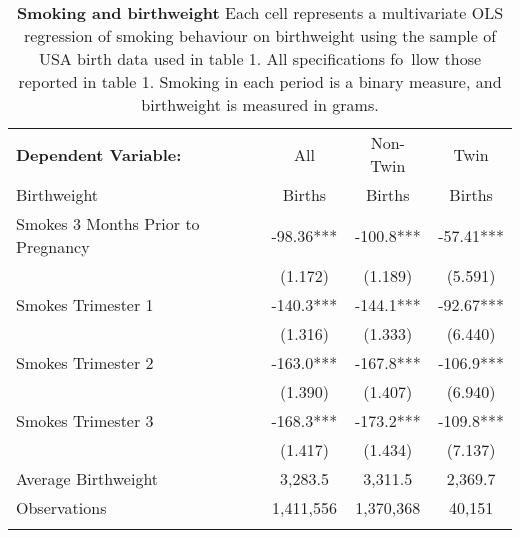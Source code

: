 \documentclass{nature}
\begin{document}
\begin{linenumbers}
\begin{spacing}{1}
\begin{table}
  \begin{center}
    \begin{tabular}{lccc}
      \toprule
      \textbf{Dependent Variable:}      & All & Non-Twin & Twin \\
      Birthweight      & Births & Births & Births \\
      \midrule
      Smokes 3 Months Prior to Pregnancy & -98.36*** & -100.8*** & -57.41*** \\
      & (1.172) & (1.189) &  (5.591) \\
      Smokes Trimester 1 & -140.3*** & -144.1*** & -92.67*** \\
      & (1.316) & (1.333) & (6.440) \\
      Smokes Trimester 2 & -163.0*** & -167.8*** & -106.9*** \\
      & (1.390) & (1.407) & (6.940) \\
      Smokes Trimester 3 & -168.3*** & -173.2*** & -109.8*** \\
      & (1.417) & (1.434) & (7.137) \\
      \midrule
      Average Birthweight & 3,283.5   & 3,311.5   & 2,369.7 \\
      Observations        & 1,411,556 & 1,370,368 & 40,151  \\
      \bottomrule
      \caption{\textbf{Smoking and birthweight} {\footnotesize Each cell represents a multivariate OLS regression of smoking behaviour on birthweight using the sample of USA birth data used in table 1.  All specifications fo\
          llow those reported in table 1.  Smoking in each period is a binary measure, and birthweight is measured in grams.}}
    \end{tabular}
  \end{center}
\end{table}




\end{spacing}


\end{linenumbers}
\end{document}
